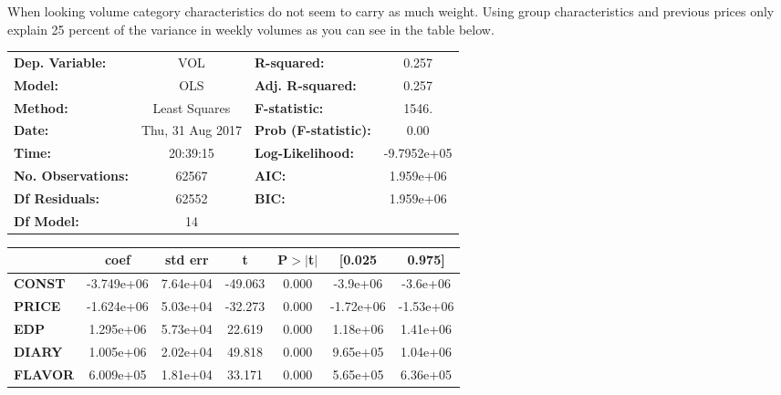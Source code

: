 \documentclass{article}
\begin{document}
When looking volume category characteristics do not seem to carry as much weight. Using group characteristics and previous prices only explain 25 percent of the variance in weekly volumes as you can see in the table below.

\begin{center}
\begin{tabular}{lclc}
\toprule
\textbf{Dep. Variable:}    &        VOL         & \textbf{  R-squared:         } &      0.257   \\
\textbf{Model:}            &       OLS        & \textbf{  Adj. R-squared:    } &      0.257   \\
\textbf{Method:}           &  Least Squares   & \textbf{  F-statistic:       } &      1546.   \\
\textbf{Date:}             & Thu, 31 Aug 2017 & \textbf{  Prob (F-statistic):} &      0.00    \\
\textbf{Time:}             &     20:39:15     & \textbf{  Log-Likelihood:    } & -9.7952e+05  \\
\textbf{No. Observations:} &       62567      & \textbf{  AIC:               } &  1.959e+06   \\
\textbf{Df Residuals:}     &       62552      & \textbf{  BIC:               } &  1.959e+06   \\
\textbf{Df Model:}         &          14      & \textbf{                     } &              \\
\bottomrule
\end{tabular}
\begin{tabular}{lcccccc}
               & \textbf{coef} & \textbf{std err} & \textbf{t} & \textbf{P$>$$|$t$|$} & \textbf{[0.025} & \textbf{0.975]}  \\
\midrule
\textbf{CONST} &   -3.749e+06  &     7.64e+04     &   -49.063  &         0.000        &     -3.9e+06    &     -3.6e+06     \\
\textbf{PRICE}    &   -1.624e+06  &     5.03e+04     &   -32.273  &         0.000        &    -1.72e+06    &    -1.53e+06     \\
\textbf{EDP}    &    1.295e+06  &     5.73e+04     &    22.619  &         0.000        &     1.18e+06    &     1.41e+06     \\
\textbf{DIARY}    &    1.005e+06  &     2.02e+04     &    49.818  &         0.000        &     9.65e+05    &     1.04e+06     \\
\textbf{FLAVOR}    &    6.009e+05  &     1.81e+04     &    33.171  &         0.000        &     5.65e+05    &     6.36e+05     \\

\end{tabular}
\end{center}
\end{document}
